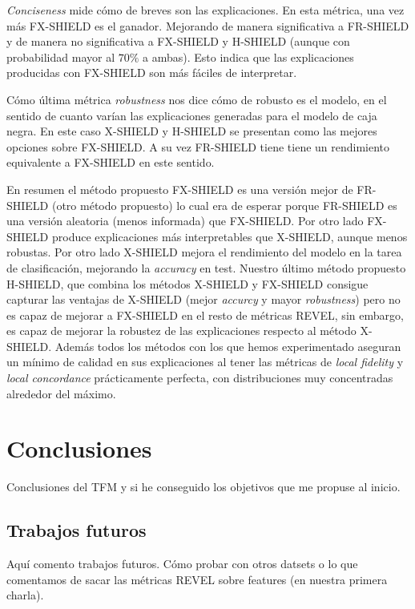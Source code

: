 \textit{Conciseness} mide cómo de breves son las explicaciones. En esta métrica, una vez más FX-SHIELD es el ganador. Mejorando de manera significativa a FR-SHIELD y de manera no significativa a FX-SHIELD y H-SHIELD (aunque con probabilidad mayor al $70\%$ a ambas). Esto indica que las explicaciones producidas con FX-SHIELD son más fáciles de interpretar.

Cómo última métrica \textit{robustness} nos dice cómo de robusto es el modelo, en el sentido de cuanto varían las explicaciones generadas para el modelo de caja negra. En este caso X-SHIELD y H-SHIELD se presentan como las mejores opciones sobre FX-SHIELD. A su vez FR-SHIELD tiene tiene un rendimiento equivalente a FX-SHIELD en este sentido. 

En resumen el método propuesto FX-SHIELD es una versión mejor de FR-SHIELD (otro método propuesto) lo cual era de esperar porque FR-SHIELD es una versión aleatoria (menos informada) que FX-SHIELD. Por otro lado FX-SHIELD produce explicaciones más interpretables que X-SHIELD, aunque menos robustas. Por otro lado X-SHIELD mejora el rendimiento del modelo en la tarea de clasificación, mejorando la \textit{accuracy} en test. Nuestro último método propuesto H-SHIELD, que combina los métodos X-SHIELD y FX-SHIELD consigue capturar las ventajas de X-SHIELD (mejor \textit{accurcy} y mayor \textit{robustness}) pero no es capaz de mejorar a FX-SHIELD en el resto de métricas REVEL, sin embargo, es capaz de mejorar la robustez de las explicaciones respecto al método X-SHIELD. Además todos los métodos con los que hemos experimentado aseguran un mínimo de calidad en sus explicaciones al tener las métricas de \textit{local fidelity} y \textit{local concordance} prácticamente perfecta, con distribuciones muy concentradas alrededor del máximo.

\clearpage
\chapter{Conclusiones} \label{cap:conc}
Conclusiones del TFM y si he conseguido los objetivos que me propuse al inicio.

\section{Trabajos futuros}

Aquí comento trabajos futuros. Cómo probar con otros datsets o lo que comentamos de sacar las métricas REVEL sobre features (en nuestra primera charla).


